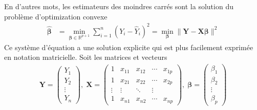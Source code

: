 \documentclass[
  11pt,
  letterpaper,
]{scrbook}
\theoremstyle{plain}
\theoremstyle{plain}
\theoremstyle{definition}
\theoremstyle{definition}
\theoremstyle{remark}
\begin{document}
En d'autres mots, les estimateurs des moindres carrés sont la solution
du problème d'optimization convexe \begin{align*}
\widehat{\boldsymbol{\beta}} &=\min_{\boldsymbol{\beta} \in \mathbb{R}^{p+1}}\sum_{i=1}^n (Y_i-\widehat{Y}_i)^2= \min_{\boldsymbol{\beta}} \|\boldsymbol{Y}-\mathbf{X}\boldsymbol{\beta}\|^2
\end{align*} Ce système d'équation a une solution explicite qui est plus
facilement exprimée en notation matricielle. Soit les matrices et
vecteurs \begin{align*}
\boldsymbol{Y} =
 \begin{pmatrix}
  Y_1 \\
  Y_2 \\
  \vdots \\
  Y_n
 \end{pmatrix} ,
 \;
\mathbf{X} = \begin{pmatrix}
1 & x_{11} & x_{12} & \cdots & x_{1p} \\
1 & x_{21} & x_{22} & \cdots & x_{2p} \\
\vdots & \vdots & \ddots & \vdots \\
1 & x_{n1} & x_{n2} & \cdots & x_{np}
\end{pmatrix} , \;
\boldsymbol{\beta} =
 \begin{pmatrix}
  \beta_1 \\
  \beta_2 \\
  \vdots \\
  \beta_p
 \end{pmatrix}
\end{align*}
\end{document}
